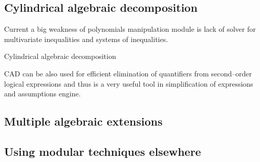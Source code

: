 \subsection{Cylindrical algebraic decomposition}

Current a big weakness of polynomials manipulation module is lack of solver for multivariate
inequalities and systems of inequalities.

Cylindrical algebraic decomposition

\cite{Arnon1984basic}
\cite{Jirstrand1995cylindrical}

CAD can be also used for efficient elimination of quantifiers from second--order logical
expressions and thus is a very useful tool in simplification of expressions and assumptions engine.


\subsection{Multiple algebraic extensions}

\cite{vanHoeij2002modgcd}


\subsection{Using modular techniques elsewhere}

\cite{Gerhard2006modular}

